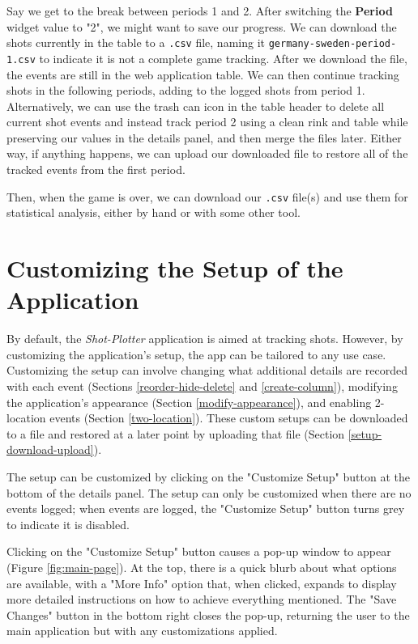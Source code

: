 \documentclass[letterpaper]{article}
\begin{document}
Say we get to the break between periods 1 and 2. After switching the \textbf{Period} widget value to "2", we might want to save our progress. We can download the shots currently in the table to a \texttt{.csv} file, naming it \texttt{germany-sweden-period-1.csv} to indicate it is not a complete game tracking. After we download the file, the events are still in the web application table. We can then continue tracking shots in the following periods, adding to the logged shots from period 1. Alternatively, we can use the trash can icon in the table header to delete all current shot events and instead track period 2 using a clean rink and table while preserving our values in the details panel, and then merge the files later. Either way, if anything happens, we can upload our downloaded file to restore all of the tracked events from the first period.

Then, when the game is over, we can download our \texttt{.csv} file(s) and use them for statistical analysis, either by hand or with some other tool.

\section{Customizing the Setup of the Application}
By default, the \textit{Shot-Plotter} application is aimed at tracking shots. However, by customizing the application's setup, the app can be tailored to any use case. Customizing the setup can involve changing what additional details are recorded with each event (Sections \ref{reorder-hide-delete} and \ref{create-column}), modifying the application's appearance (Section \ref{modify-appearance}), and enabling 2-location events (Section \ref{two-location}). These custom setups can be downloaded to a file and restored at a later point by uploading that file (Section \ref{setup-download-upload}).

The setup can be customized by clicking on the "Customize Setup" button at the bottom of the details panel. The setup can only be customized when there are no events logged; when events are logged, the "Customize Setup" button turns grey to indicate it is disabled.

Clicking on the "Customize Setup" button causes a pop-up window to appear (Figure \ref{fig:main-page}). At the top, there is a quick blurb about what options are available, with a "More Info" option that, when clicked, expands to display more detailed instructions on how to achieve everything mentioned. The "Save Changes" button in the bottom right closes the pop-up, returning the user to the main application but with any customizations applied.
\end{document}
